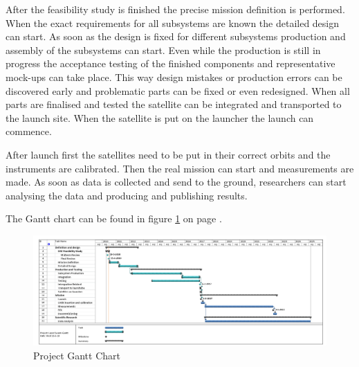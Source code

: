 After the feasibility study is finished the precise mission definition is performed. When the exact requirements for all subsystems are known the detailed design can start. As soon as the design is fixed for different subsystems production and assembly of the subsystems can start. Even while the production is still in progress the acceptance testing of the finished components and representative mock-ups can take place. This way design mistakes or production errors can be discovered early and problematic parts can be fixed or even redesigned. When all parts are finalised and tested the satellite can be integrated and transported to the launch site. When the satellite is put on the launcher the launch can commence.

After launch first the satellites need to be put in their correct orbits and the instruments are calibrated. Then the real mission can start and measurements are made. As soon as data is collected and send to the ground, researchers can start analysing the data and producing and publishing results. 

The Gantt chart can be found in figure \ref{ganttchart} on page \pageref{ganttchart}.

\begin{figure}
\centering
\includegraphics[width=1.2\textwidth, angle=90]{chapters/img/projectganttchart.png}
\caption{Project Gantt Chart}
\label{ganttchart}
\end{figure}